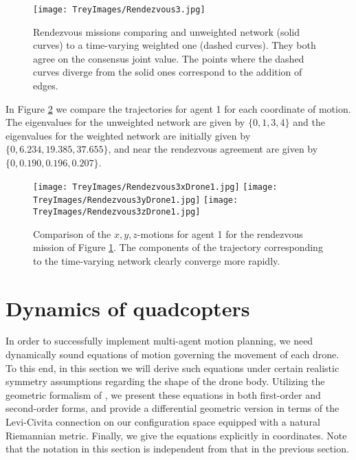 \documentclass{aims}
\theoremstyle{definition}
\begin{document}
\begin{figure}[h!]
\texttt{[image: TreyImages/Rendezvous3.jpg]}
\caption{Rendezvous missions comparing and unweighted network (solid curves) to a time-varying weighted one (dashed curves). They both agree on the consensus joint value. The points where the dashed curves diverge from the solid ones correspond to the addition of edges.}
\label{Fig-rendezvous3}
\end{figure}
In Figure \ref{Fig-rendezvous3-xyz} we compare the trajectories for agent 1 for each coordinate of motion. The eigenvalues for the unweighted network are given by $\{0,1,3,4\}$ and the eigenvalues for the weighted network are initially given by $\{0,6.234,19.385,37.655\}$, and near the rendezvous agreement are given by $\{0,0.190,0.196,0.207\}$.

\begin{figure}[h!]
\texttt{[image: TreyImages/Rendezvous3xDrone1.jpg]}
\texttt{[image: TreyImages/Rendezvous3yDrone1.jpg]}
\texttt{[image: TreyImages/Rendezvous3zDrone1.jpg]}
\caption{Comparison of the $x,y,z$-motions for agent 1 for the rendezvous mission of Figure \ref{Fig-rendezvous3}. The components of the trajectory corresponding to the time-varying network clearly converge more rapidly.}
\label{Fig-rendezvous3-xyz}
\end{figure}


\newpage
\section{Dynamics of quadcopters}
\label{section-dynamics}



In order to successfully implement multi-agent motion planning, we need dynamically sound equations of motion governing the movement of each drone.  To this end, in this section we will derive such equations under certain realistic symmetry assumptions regarding the shape of the drone body.  Utilizing the geometric formalism of \cite{Bullo Lewis}, we present these equations in both first-order and second-order forms, and provide a differential geometric version in terms of the Levi-Civita connection on our configuration space equipped with a natural Riemannian metric.   Finally, we give the equations explicitly in coordinates.  Note that the notation in this section is independent from that in the previous section.
\end{document}
